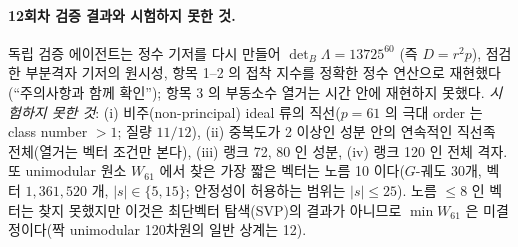 \paragraph{12회차 검증 결과와 시험하지 못한 것.} 독립 검증 에이전트는 정수 기저를 다시 만들어 $\det_B\Lambda=13725^{60}$ (즉 $D=r^2p$), 점검한 부분격자 기저의 원시성, 항목 1--2 의 접착 지수를 정확한 정수 연산으로 재현했다(``주의사항과 함께 확인''); 항목 3 의 부동소수 열거는 시간 안에 재현하지 못했다. \emph{시험하지 못한 것}: (i) 비주(non-principal) ideal 류의 직선($p=61$ 의 극대 order 는 class number $>1$; 질량 $11/12$), (ii) 중복도가 2 이상인 성분 안의 연속적인 직선족 전체(열거는 벡터 조건만 본다), (iii) 랭크 72, 80 인 성분, (iv) 랭크 120 인 전체 격자. 또 unimodular 원소 $W_{61}$ 에서 찾은 가장 짧은 벡터는 노름 10 이다($G$-궤도 30개, 벡터 $1{,}361{,}520$ 개, $|s|\in\{5,15\}$; 안정성이 허용하는 범위는 $|s|\le25$). 노름 $\le8$ 인 벡터는 찾지 못했지만 이것은 최단벡터 탐색(SVP)의 결과가 아니므로 $\min W_{61}$ 은 미결정이다(짝 unimodular 120차원의 일반 상계는 12).

